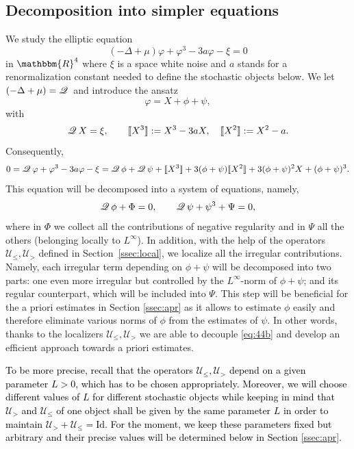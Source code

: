 \documentclass[a4paper,11pt]{article}
\renewcommand{\leq}{\leqslant}
\newcommand{\assign}{:=}
\numberwithin{equation}{section}
\newcommand{\UU}{\mathscr{U}}
\newcommand{\Q}{\mathscr{Q} \hspace{.2em}}
\newcommand{\rmbb}[1]{\textcolor{black}{#1}}
\newcommand{\8}{\infty}
\begin{document}
\subsection{Decomposition into simpler equations}
\label{ssec:decomp}

We  study the elliptic equation
\begin{equation*}%
(- \Delta + \mu) \varphi + \varphi^3 - 3 a \varphi - \xi = 0
\end{equation*}
in $\mathbbm{R}^4$ where $\xi$ is a space white noise and $a$ stands for a renormalization constant needed to define the stochastic objects below. We let $(- \Delta +
\mu) = \Q$ and introduce the ansatz
\[ \varphi = X + \phi + \psi, \]
with
\begin{equation*}%
 \Q X = \xi, \qquad \llbracket X^3 \rrbracket \assign X^3 - 3 a X, \quad
   \llbracket X^2 \rrbracket \assign X^2 - a.
\end{equation*}
Consequently,
\[ 0 = \Q \varphi + \varphi^3 - 3 a \varphi - \xi = \Q \phi + \Q \psi +
   \llbracket X^3 \rrbracket + 3 (\phi + \psi) \llbracket X^2 \rrbracket + 3
   (\phi + \psi)^2 X + (\phi + \psi)^3 . \]
This equation will be decomposed into a system of equations, namely,
\begin{equation}\label{eq:44b}
\Q \phi + \Phi = 0, \qquad \Q \psi + \psi^3 + \Psi = 0,
\end{equation}
where in $\Phi$ we collect all the contributions of negative regularity and in
$\Psi$ all the others (belonging locally to $L^{\infty}$). In addition, with the help of  the operators $\UU_{\leqslant},
\UU_{>}$ defined in Section~\ref{ssec:local}, we localize all the irregular contributions. Namely, each irregular term depending on $\phi+\psi$ will be decomposed into two parts: one even more irregular but controlled by the $L^{\8}$-norm of $\phi+\psi$; and its regular counterpart, which will be included into $\Psi$. This step will be beneficial for the a priori estimates in Section \ref{ssec:apr} as it allows to estimate $\phi$ easily and therefore  eliminate various norms of $\phi$ from the estimates of $\psi$. In other words, thanks to the localizers $\UU_{\leqslant}, \UU_{>}$ we are able to decouple \eqref{eq:44b} and develop an efficient approach towards a priori estimates.

\rmbb{To be more precise,  recall that the operators $\UU_{\leqslant}, \UU_{>}$ depend on a given parameter $L>0$, which has to be chosen appropriately. Moreover, we will choose different values of $L$ for different stochastic objects while keeping in mind that $\UU_{>}$ and $\UU_{\leq}$ of one object shall be given by the same parameter $L$ in order to maintain $\UU_{>}
+\UU_{\leqslant} = \mathrm{Id}$. For the moment, we keep these parameters fixed but arbitrary and their precise values will be determined  below in Section \ref{ssec:apr}.}
\end{document}
